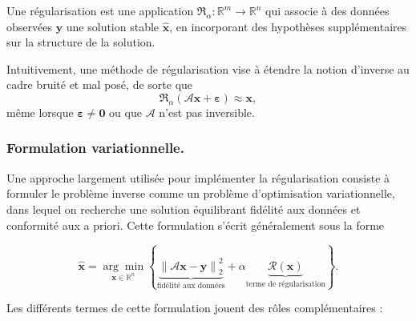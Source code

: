 \begin{definition}
Une régularisation est une application
$\mathfrak{R}_{\alpha} : \mathbb{R}^m \rightarrow \mathbb{R}^n$ qui associe à
des données observées $\mathbf{y}$ une solution stable $\hat{\mathbf{x}}$,
en incorporant des hypothèses supplémentaires sur la structure de la solution.
\end{definition}

Intuitivement, une méthode de régularisation vise à étendre la notion d'inverse
au cadre bruité et mal posé, de sorte que
\begin{equation}
\mathfrak{R}_{\alpha}(\mathcal{A}\mathbf{x} + \boldsymbol{\varepsilon})
\approx \mathbf{x},
\end{equation}
même lorsque $\boldsymbol{\varepsilon} \neq \mathbf{0}$ ou que
$\mathcal{A}$ n'est pas inversible.

\subsubsection{Formulation variationnelle.}
Une approche largement utilisée pour implémenter la régularisation consiste à
formuler le problème inverse comme un problème d'optimisation variationnelle,
dans lequel on recherche une solution équilibrant fidélité aux données et
conformité aux a priori. Cette formulation s'écrit généralement sous la forme

\begin{equation}
    \hat{\mathbf{x}} =
    \underset{\mathbf{x} \in \mathbb{R}^n}{\arg\min}
    \left\{
    \underbrace{\left\| \mathcal{A}\mathbf{x} - \mathbf{y} \right\|_{2}^{2}}_{\text{fidélité aux données}}
    + \alpha
    \underbrace{\mathcal{R}(\mathbf{x})}_{\text{terme de régularisation}}
    \right\}.
\end{equation}

Les différents termes de cette formulation jouent des rôles complémentaires :

